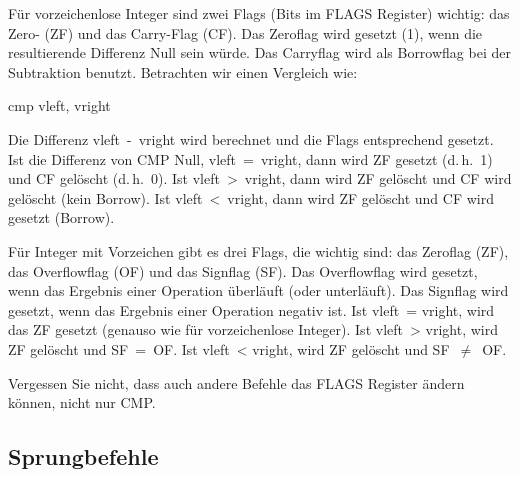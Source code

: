  F\"{u}r vorzeichenlose Integer sind
zwei Flags (Bits im FLAGS Register) wichtig: das Zero- (ZF)
 und das Carry-Flag (CF).
 Das Zero\-flag wird gesetzt (1), wenn die
resultierende Differenz Null sein w\"{u}rde. Das Carryflag wird als
Borrowflag bei der Subtraktion benutzt. Betrachten wir einen
Vergleich wie:
\begin{AsmCodeListing}[frame=none, numbers=none]
      cmp    vleft, vright
\end{AsmCodeListing}
Die Differenz {\code vleft~-~vright} wird berechnet und die Flags
entsprechend gesetzt. Ist die Differenz von {\code CMP} Null, {\code
vleft~=~vright}, dann wird ZF gesetzt (d.\,h.~1) und CF gel\"{o}scht
(d.\,h.~0). Ist {\code vleft~>~vright}, dann wird ZF gel\"{o}scht und CF
wird gel\"{o}scht (kein Borrow). Ist {\code vleft~<~vright}, dann wird
ZF gel\"{o}scht und CF wird gesetzt (Borrow). 

 F\"{u}r Integer mit Vorzeichen
 gibt es drei Flags, die wichtig sind: das Zero\-flag
 (ZF), das Overflowflag
 (OF) und das Signflag
 (SF). Das Over\-flow\-flag wird gesetzt,
wenn das Ergebnis einer Operation \"{u}berl\"{a}uft (oder unterl\"{a}uft). Das
Sign\-flag wird gesetzt, wenn das Ergebnis einer Operation negativ
ist. Ist {\code vleft~= vright}, wird das ZF gesetzt (genauso wie
f\"{u}r vorzeichenlose Integer). Ist {\code vleft~> vright}, wird ZF
gel\"{o}scht und SF~=~OF\@. Ist {\code vleft~< vright}, wird ZF gel\"{o}scht
und SF~$\neq$~OF\@. 

Vergessen Sie nicht, dass auch andere Befehle das FLAGS Register
\"{a}ndern k\"{o}nnen, nicht nur {\code CMP}\@.
 
 

\subsection{Sprungbefehle}

